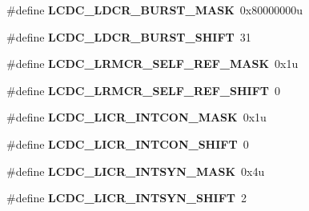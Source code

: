 \begin{DoxyCompactItemize}
\item 
\hypertarget{group___l_c_d_c___register___masks_ga366996ce07f17b4afe25a999a462f771}{}\#define {\bfseries L\+C\+D\+C\+\_\+\+L\+D\+C\+R\+\_\+\+B\+U\+R\+S\+T\+\_\+\+M\+A\+S\+K}~0x80000000u\label{group___l_c_d_c___register___masks_ga366996ce07f17b4afe25a999a462f771}

\item 
\hypertarget{group___l_c_d_c___register___masks_gac4929ff74fe47903eb7e911cdbfc431e}{}\#define {\bfseries L\+C\+D\+C\+\_\+\+L\+D\+C\+R\+\_\+\+B\+U\+R\+S\+T\+\_\+\+S\+H\+I\+F\+T}~31\label{group___l_c_d_c___register___masks_gac4929ff74fe47903eb7e911cdbfc431e}

\item 
\hypertarget{group___l_c_d_c___register___masks_ga8b891d409fa7ff317c1d3f703dd7b737}{}\#define {\bfseries L\+C\+D\+C\+\_\+\+L\+R\+M\+C\+R\+\_\+\+S\+E\+L\+F\+\_\+\+R\+E\+F\+\_\+\+M\+A\+S\+K}~0x1u\label{group___l_c_d_c___register___masks_ga8b891d409fa7ff317c1d3f703dd7b737}

\item 
\hypertarget{group___l_c_d_c___register___masks_gab2e3c3b37bf22f7d89139bd480596d62}{}\#define {\bfseries L\+C\+D\+C\+\_\+\+L\+R\+M\+C\+R\+\_\+\+S\+E\+L\+F\+\_\+\+R\+E\+F\+\_\+\+S\+H\+I\+F\+T}~0\label{group___l_c_d_c___register___masks_gab2e3c3b37bf22f7d89139bd480596d62}

\item 
\hypertarget{group___l_c_d_c___register___masks_ga6474dddeb4e89ed886899dde7c949a75}{}\#define {\bfseries L\+C\+D\+C\+\_\+\+L\+I\+C\+R\+\_\+\+I\+N\+T\+C\+O\+N\+\_\+\+M\+A\+S\+K}~0x1u\label{group___l_c_d_c___register___masks_ga6474dddeb4e89ed886899dde7c949a75}

\item 
\hypertarget{group___l_c_d_c___register___masks_ga730333976c7a32d6f2a48f1b343745d4}{}\#define {\bfseries L\+C\+D\+C\+\_\+\+L\+I\+C\+R\+\_\+\+I\+N\+T\+C\+O\+N\+\_\+\+S\+H\+I\+F\+T}~0\label{group___l_c_d_c___register___masks_ga730333976c7a32d6f2a48f1b343745d4}

\item 
\hypertarget{group___l_c_d_c___register___masks_gac1aee10f34ff44f39a8ee9d7e1a4b3e9}{}\#define {\bfseries L\+C\+D\+C\+\_\+\+L\+I\+C\+R\+\_\+\+I\+N\+T\+S\+Y\+N\+\_\+\+M\+A\+S\+K}~0x4u\label{group___l_c_d_c___register___masks_gac1aee10f34ff44f39a8ee9d7e1a4b3e9}

\item 
\hypertarget{group___l_c_d_c___register___masks_gad454a8f4616e67f7011edd192d92360f}{}\#define {\bfseries L\+C\+D\+C\+\_\+\+L\+I\+C\+R\+\_\+\+I\+N\+T\+S\+Y\+N\+\_\+\+S\+H\+I\+F\+T}~2\label{group___l_c_d_c___register___masks_gad454a8f4616e67f7011edd192d92360f}


\end{DoxyCompactItemize}
